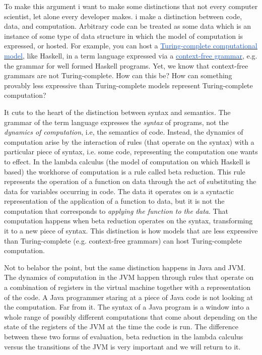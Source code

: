To make this argument i want to make some distinctions that not every computer scientist, let alone every developer makes. i make a distinction between code, data, and computation. Arbitrary code can be treated as some data which is an instance of some type of data structure in which the model of computation is expressed, or hosted. For example, you can host a \href{https://en.wikipedia.org/wiki/Turing_completeness}{\uline{\textcolor[HTML]{1155CC}{Turing-complete computational model}}}, like Haskell, in a term language expressed via a \href{https://en.wikipedia.org/wiki/Context-free_grammar}{\uline{\textcolor[HTML]{1155CC}{context-free grammar}}}, e.g. the grammar for well formed Haskell programs. Yet, we know that context-free grammars are not Turing-complete. How can this be? How can something provably less expressive than Turing-complete models represent Turing-complete computation?

\vspace{1\baselineskip}
It cuts to the heart of the distinction between syntax and semantics. The grammar of the term language expresses the \textit{syntax} of programs, not the \textit{dynamics of computation}, i.e, the semantics of code. Instead, the dynamics of computation arise by the interaction of rules (that operate on the syntax) with a particular piece of syntax, i.e. some code, representing the computation one wants to effect. In the lambda calculus (the model of computation on which Haskell is based) the workhorse of computation is a rule called beta reduction. This rule represents the operation of a function on data through the act of substituting the data for variables occurring in code. The data it operates on is a syntactic representation of the application of a function to data, but it is not the computation that corresponds to \textit{applying the function to the data}. That computation happens when beta reduction operates on the syntax, transforming it to a new piece of syntax. This distinction is how models that are less expressive than Turing-complete (e.g. context-free grammars) can host Turing-complete computation. 

\vspace{1\baselineskip}
Not to belabor the point, but the same distinction happens in Java and JVM. The dynamics of computation in the JVM happen through rules that operate on a combination of registers in the virtual machine together with a representation of the code. A Java programmer staring at a piece of Java code is not looking at the computation. Far from it. The syntax of a Java program is a window into a whole range of possibly different computations that come about depending on the state of the registers of the JVM at the time the code is run. The difference between these two forms of evaluation, beta reduction in the lambda calculus versus the transitions of the JVM is very important and we will return to it.

